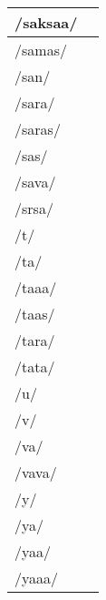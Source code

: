 \documentclass{article}
\begin{document}
\begin{longtable}{|l|p{}|}
/saksaa/ & \textIndus{} \\ \hline
/samas/ & \textIndus{} \\ \hline
/san/ & \textIndus{} \\ \hline
/sara/ & \textIndus{} \\ \hline
/saras/ & \textIndus{} \\ \hline
/sas/ & \textIndus{} \\ \hline
/sava/ & \textIndus{} \\ \hline
/srsa/ & \textIndus{} \\ \hline
/t/ & \textIndus{} \\ \hline
/ta/ & \textIndus{} \\ \hline
/taaa/ & \textIndus{} \\ \hline
/taas/ & \textIndus{} \\ \hline
/tara/ & \textIndus{} \\ \hline
/tata/ & \textIndus{} \\ \hline
/u/ & \textIndus{} \\ \hline
/v/ & \textIndus{} \\ \hline
/va/ & \textIndus{} \\ \hline
/vava/ & \textIndus{} \\ \hline
/y/ & \textIndus{} \\ \hline
/ya/ & \textIndus{} \\ \hline
/yaa/ & \textIndus{} \\ \hline
/yaaa/ & \textIndus{} \\ \hline
\end{longtable}
\end{document}
